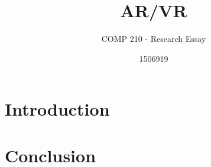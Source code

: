 \documentclass{scrartcl}
\title{AR/VR}
\subtitle{COMP 210 - Research Essay}
\author{1506919}
\begin{document}
\maketitle

\abstract{}

\section*{Introduction}

\cite{mentzelopoulos2015hardware}

\section*{Conclusion}



\end{document}
